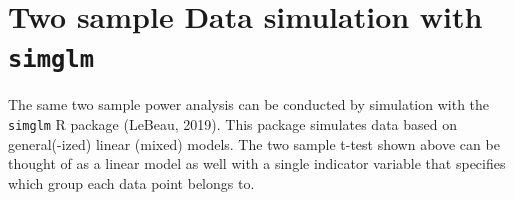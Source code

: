 \documentclass[man]{apa6}
\newenvironment{Shaded}{\begin{snugshade}}{\end{snugshade}}
\newcommand{\DataTypeTok}[1]{\textcolor[rgb]{0.13,0.29,0.53}{#1}}
\newcommand{\DecValTok}[1]{\textcolor[rgb]{0.00,0.00,0.81}{#1}}
\newcommand{\FloatTok}[1]{\textcolor[rgb]{0.00,0.00,0.81}{#1}}
\newcommand{\KeywordTok}[1]{\textcolor[rgb]{0.13,0.29,0.53}{\textbf{#1}}}
\newcommand{\NormalTok}[1]{#1}
\newcommand{\OperatorTok}[1]{\textcolor[rgb]{0.81,0.36,0.00}{\textbf{#1}}}
\newcommand{\OtherTok}[1]{\textcolor[rgb]{0.56,0.35,0.01}{#1}}
\newcommand{\StringTok}[1]{\textcolor[rgb]{0.31,0.60,0.02}{#1}}
\begin{document}
\hypertarget{two-sample-data-simulation-with-simglm}{%
\section{\texorpdfstring{Two sample Data simulation with \texttt{simglm}}{Two sample Data simulation with simglm}}\label{two-sample-data-simulation-with-simglm}}

The same two sample power analysis can be conducted by simulation with the \texttt{simglm} R package (LeBeau, 2019). This package simulates data based on general(-ized) linear (mixed) models. The two sample t-test shown above can be thought of as a linear model as well with a single indicator variable that specifies which group each data point belongs to.

\begin{Shaded}
\end{Shaded}
\end{document}
